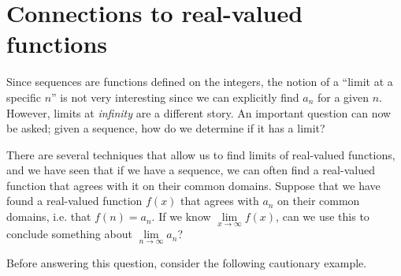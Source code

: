\documentclass{ximera}
\begin{document}
\section{Connections to real-valued functions}
Since sequences are functions defined on the integers, the notion of a ``limit at a specific $n$'' is not very interesting since we can explicitly find $a_n$ for a given $n$. However, limits at \textit{infinity} are a different story.  An important question can now be asked; given a sequence, how do we determine if it has a limit?  

There are several techniques that allow us to find limits of real-valued functions, and we have seen that if we have a sequence, we can often find a real-valued function that agrees with it on their common domains.   Suppose that we have found a real-valued function $f(x)$ that agrees with $a_n$ on their common domains, i.e. that $f(n)=a_n$.  If we know  $\lim\limits_{x\to\infty} f(x)$, can we use this to conclude something about $\lim\limits_{n \to \infty} a_n$?  

Before answering this question, consider the following cautionary example.
\end{document}
